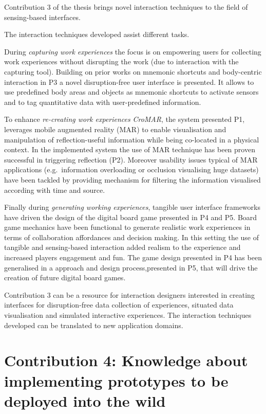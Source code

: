 Contribution 3 of the thesis brings novel interaction techniques to the field of sensing-based interfaces.

The interaction techniques developed assist different tasks.

During \emph{capturing work experiences} the focus is on empowering users for collecting work experiences without disrupting the work (due to interaction with the capturing tool). Building on prior works on mnemonic shortcuts \autocite{Guerreiro:2008wt} and body-centric interaction \autocite{Chen:2012wk} in P3 a novel disruption-free user interface is presented. It allows to use predefined body areas and objects as mnemonic shortcuts to activate sensors and to tag quantitative data with user-predefined information.

To enhance \emph{re-creating work experiences} \emph{CroMAR}, the system presented P1, leverages mobile augmented reality (MAR) to enable visualisation and manipulation of reflection-useful information while being co-located in a physical context. In the implemented system the use of MAR technique has been proven successful in triggering reflection (P2). Moreover usability issues typical of MAR applications (e.g.~information overloading or occlusion visualising huge datasets) have been tackled by providing mechanism for filtering the information visualised according with time and source.

Finally during \emph{generating working experiences}, tangible user interface frameworks have driven the design of the digital board game presented in P4 and P5. Board game mechanics have been functional to generate realistic work experiences in terms of collaboration affordances and decision making. In this setting the use of tangible and sensing-based interaction added realism to the experience and increased players engagement and fun. The game design presented in P4 has been generalised in a approach and design process,presented in P5, that will drive the creation of future digital board games.

Contribution 3 can be a resource for interaction designers interested in creating interfaces for disruption-free data collection of experiences, situated data visualisation and simulated interactive experiences. The interaction techniques developed can be translated to new application domains.

\section{Contribution 4: Knowledge about implementing prototypes to be deployed into the wild}\label{c4-knowledge-about-implementing-prototypes-to-be-deployed-into-the-wild}

